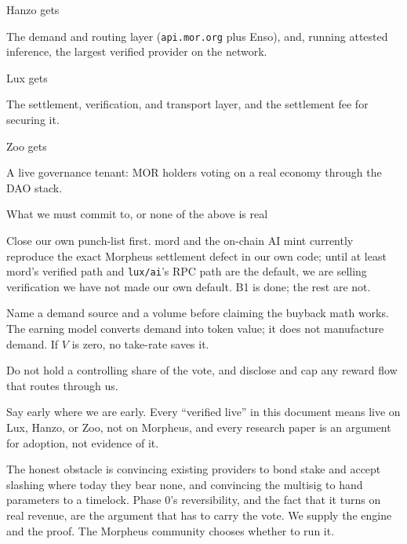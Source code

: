 \documentclass[11pt,a4paper]{article}
\newcommand{\code}[1]{\texttt{\small #1}}
\begin{document}
\begin{stake}{Hanzo gets}
  \item The demand and routing layer (\code{api.mor.org} plus Enso), and, running attested
    inference, the largest verified provider on the network.
\end{stake}

\begin{stake}{Lux gets}
  \item The settlement, verification, and transport layer, and the settlement fee for securing
    it.
\end{stake}

\begin{stake}{Zoo gets}
  \item A live governance tenant: MOR holders voting on a real economy through the DAO stack.
\end{stake}

\begin{stake}{What we must commit to, or none of the above is real}
  \item Close our own punch-list first. mord and the on-chain AI mint currently reproduce the
    exact Morpheus settlement defect in our own code; until at least mord's verified path and
    \code{lux/ai}'s RPC path are the default, we are selling verification we have not made our
    own default. B1 is done; the rest are not.
  \item Name a demand source and a volume before claiming the buyback math works. The earning
    model converts demand into token value; it does not manufacture demand. If $V$ is zero, no
    take-rate saves it.
  \item Do not hold a controlling share of the vote, and disclose and cap any reward flow that
    routes through us.
  \item Say early where we are early. Every ``verified live'' in this document means live on
    Lux, Hanzo, or Zoo, not on Morpheus, and every research paper is an argument for adoption,
    not evidence of it.
\end{stake}

The honest obstacle is convincing existing providers to bond stake and accept slashing where
today they bear none, and convincing the multisig to hand parameters to a timelock. Phase 0's
reversibility, and the fact that it turns on real revenue, are the argument that has to carry
the vote. We supply the engine and the proof. The Morpheus community chooses whether to run it.
\end{document}
